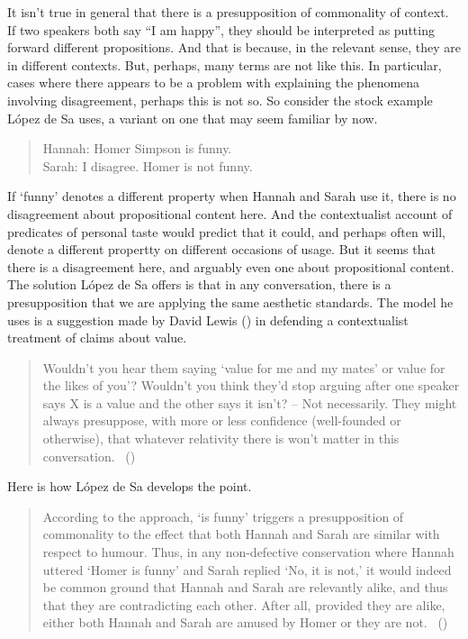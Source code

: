 \documentclass[
  11pt,
  letterpaper,
  DIV=11,
  numbers=noendperiod,
  twoside]{scrartcl}
\begin{document}
It isn't true in general that there is a presupposition of commonality
of context. If two speakers both say ``I am happy'', they should be
interpreted as putting forward different propositions. And that is
because, in the relevant sense, they are in different contexts. But,
perhaps, many terms are not like this. In particular, cases where there
appears to be a problem with explaining the phenomena involving
disagreement, perhaps this is not so. So consider the stock example
López de Sa uses, a variant on one that may seem familiar by now.

\begin{quote}
Hannah: Homer Simpson is funny.\\
Sarah: I disagree. Homer is not funny.
\end{quote}

If `funny' denotes a different property when Hannah and Sarah use it,
there is no disagreement about propositional content here. And the
contextualist account of predicates of personal taste would predict that
it could, and perhaps often will, denote a different propertty on
different occasions of usage. But it seems that there is a disagreement
here, and arguably even one about propositional content. The solution
López de Sa offers is that in any conversation, there is a
presupposition that we are applying the same aesthetic standards. The
model he uses is a suggestion made by David Lewis
() in defending a contextualist treatment
of claims about value.

\begin{quote}
Wouldn't you hear them saying `value for me and my mates' or value for
the likes of you'? Wouldn't you think they'd stop arguing after one
speaker says X is a value and the other says it isn't? -- Not
necessarily. They might always presuppose, with more or less confidence
(well-founded or otherwise), that whatever relativity there is won't
matter in this conversation. ~()
\end{quote}

Here is how López de Sa develops the point.

\begin{quote}
According to the approach, `is funny' triggers a presupposition of
commonality to the effect that both Hannah and Sarah are similar with
respect to humour. Thus, in any non-defective conservation where Hannah
uttered `Homer is funny' and Sarah replied `No, it is not,' it would
indeed be common ground that Hannah and Sarah are relevantly alike, and
thus that they are contradicting each other. After all, provided they
are alike, either both Hannah and Sarah are amused by Homer or they are
not. ~()
\end{quote}
\end{document}

